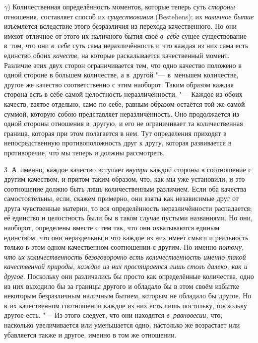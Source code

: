 $\gamma$) Количественная определённость моментов, которые теперь суть
{\em стороны} отношения, составляет способ их {\em существования} (Be\-ste\-hens);
их {\em наличное бытие} изъемлется вследствие этого безразличия из перехода
качественного. Но они имеют отличное от этого их наличного бытия своё
{\em в~себе} сущее существование в~том, что они {\em в~себе} суть сама
неразличённость и что каждая из них сама есть единство обоих {\em качеств,} на
которые раскалывается качественный момент. Различие этих двух сторон
ограничивается тем, что одно качество положено в одной стороне в большем
количестве, а в~другой "--- в~меньшем количестве, другое же качество
соответственно с этим наоборот. Таким образом каждая сторона есть в себе самой
целостность неразличённости. "--- Каждое из обоих качеств, взятое отдельно,
само по себе, равным образом остаётся той же самой суммой, которую собою
представляет неразличённость. Оно продолжается из одной стороны отношения
в~другую, и его не ограничивает та количественная граница, которая при этом
полагается в нем. Тут определения приходят в непосредственную противоположность
друг к другу, которая развивается в противоречие, чт\'{о} мы теперь и должны
рассмотреть.

3. А~именно, каждое качество вступает {\em внутри} каждой стороны в соотношение
с другим качеством, и притом таким образом, что, как мы уже установили, и это
соотношение должно быть лишь количественным различием. Если оба качества
самостоятельны, если, скажем примерно, они взяты как независимые друг от друга
чувственные материи, то вся определённость неразличённости распадается; её
единство и целостность были бы в таком случае пустыми названиями. Но они,
наоборот, определены вместе с тем так, что они охватываются единым единством,
что они нераздельны и что каждое из них имеет смысл и реальность только в этом
одном качественном соотношении с другим. Но именно {\em потому, что их
количественность безоговорочно есть количественность именно такой качественной
природы, каждое из них простирается лишь столь далеко, как и другое}. Поскольку
они различались бы просто как определённые количества, одно из них выходило бы
за границы другого и обладало бы в этом своём избытке некоторым безразличным
наличным бытием, которым не обладало бы другое. Но в их качественном
соотношении каждое из них есть лишь постольку, поскольку другое есть. "--- Из
этого следует, что они находятся {\em в~равновесии,} что, насколько
увеличивается или уменьшается одно, настолько же возрастает или убавляется
также и другое, именно в том же отношении.

